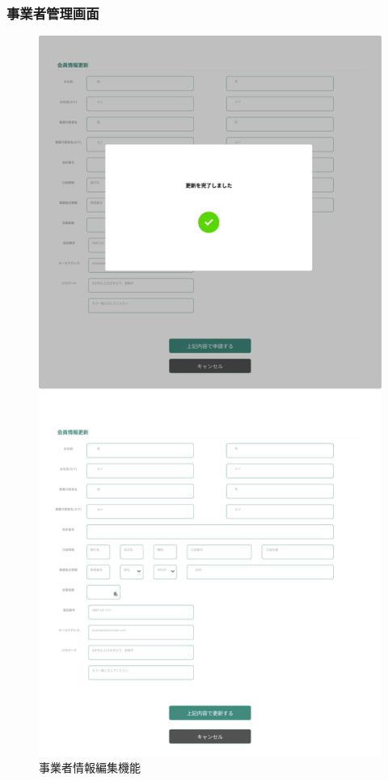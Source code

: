 \documentclass[a4paper, titlepage]{jsarticle}
\begin{document}
\subsubsection{事業者管理画面}
\begin{figure}[H]
  \centering
  \includegraphics[height=\textheight]{ui/coop_information_editing_function.pdf}
  \caption{事業者情報編集機能}
  \label{fig:coop_information_editing_function.pdf}
\end{figure}
\clearpage
\end{document}
